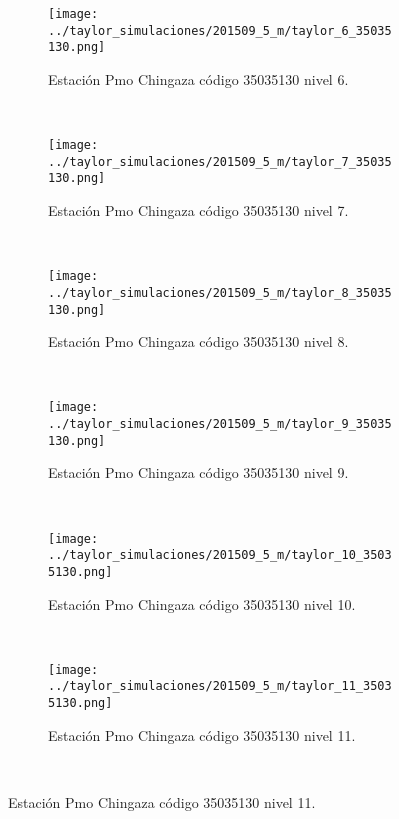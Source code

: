 \begin{figure}[H]\ContinuedFloat
\centering
\begin{subfigure}[normla]{0.4\textwidth}
\caption{Estación Pmo Chingaza  código 35035130 nivel 6.}
\texttt{[image: ../taylor\_simulaciones/201509\_5\_m/taylor\_6\_35035130.png]}
\end{subfigure}
~
\begin{subfigure}[normla]{0.4\textwidth}
\caption{Estación Pmo Chingaza  código 35035130 nivel 7.}
\texttt{[image: ../taylor\_simulaciones/201509\_5\_m/taylor\_7\_35035130.png]}
\end{subfigure}
~
\begin{subfigure}[normla]{0.4\textwidth}
\caption{Estación Pmo Chingaza  código 35035130 nivel 8.}
\texttt{[image: ../taylor\_simulaciones/201509\_5\_m/taylor\_8\_35035130.png]}
\end{subfigure}
~
\begin{subfigure}[normla]{0.4\textwidth}
\caption{Estación Pmo Chingaza  código 35035130 nivel 9.}
\texttt{[image: ../taylor\_simulaciones/201509\_5\_m/taylor\_9\_35035130.png]}
\end{subfigure}
~
\begin{subfigure}[normla]{0.4\textwidth}
\caption{Estación Pmo Chingaza  código 35035130 nivel 10.}
\texttt{[image: ../taylor\_simulaciones/201509\_5\_m/taylor\_10\_35035130.png]}
\end{subfigure}
~
\begin{subfigure}[normla]{0.4\textwidth}
\caption{Estación Pmo Chingaza  código 35035130 nivel 11.}
\texttt{[image: ../taylor\_simulaciones/201509\_5\_m/taylor\_11\_35035130.png]}
\end{subfigure}
~
\end{figure}
           
